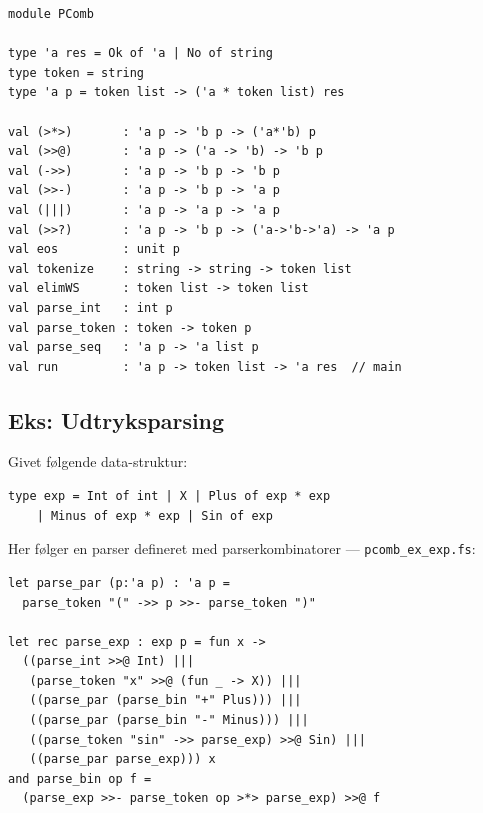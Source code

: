 \documentclass[rgb]{beamer}
\begin{document}

\begin{frame}[fragile]
\begin{footnotesize}

\begin{lstlisting}[numbers=none,frame=none]
module PComb

type 'a res = Ok of 'a | No of string
type token = string
type 'a p = token list -> ('a * token list) res

val (>*>)       : 'a p -> 'b p -> ('a*'b) p
val (>>@)       : 'a p -> ('a -> 'b) -> 'b p
val (->>)       : 'a p -> 'b p -> 'b p
val (>>-)       : 'a p -> 'b p -> 'a p
val (|||)       : 'a p -> 'a p -> 'a p
val (>>?)       : 'a p -> 'b p -> ('a->'b->'a) -> 'a p
val eos         : unit p
val tokenize    : string -> string -> token list
val elimWS      : token list -> token list
val parse_int   : int p
val parse_token : token -> token p
val parse_seq   : 'a p -> 'a list p
val run         : 'a p -> token list -> 'a res  // main
\end{lstlisting}

\end{footnotesize}
\end{frame}

\subsection{Eks: Udtryksparsing}

\begin{frame}[fragile]
\begin{footnotesize}

  Givet følgende data-struktur:

\begin{lstlisting}[numbers=none,frame=none,mathescape]
  type exp = Int of int | X | Plus of exp * exp
    | Minus of exp * exp | Sin of exp
\end{lstlisting}

\vspace{1ex}
  Her følger en parser defineret med parserkombinatorer --- \lstinline{pcomb_ex_exp.fs}:
\vspace{1ex}

\begin{lstlisting}[numbers=none,frame=none,mathescape]
let parse_par (p:'a p) : 'a p =
  parse_token "(" ->> p >>- parse_token ")"

let rec parse_exp : exp p = fun x ->
  ((parse_int >>@ Int) |||
   (parse_token "x" >>@ (fun _ -> X)) |||
   ((parse_par (parse_bin "+" Plus))) |||
   ((parse_par (parse_bin "-" Minus))) |||
   ((parse_token "sin" ->> parse_exp) >>@ Sin) |||
   ((parse_par parse_exp))) x
and parse_bin op f =
  (parse_exp >>- parse_token op >*> parse_exp) >>@ f
\end{lstlisting}

\end{footnotesize}
\end{frame}
\end{document}
